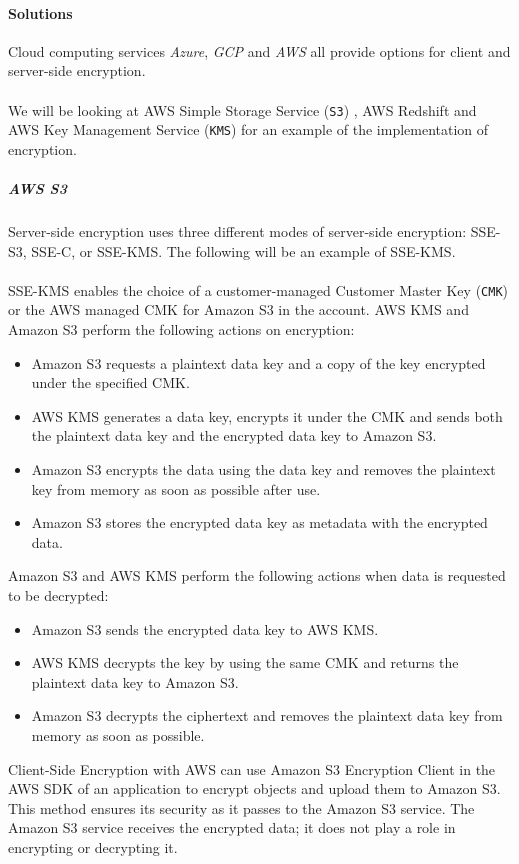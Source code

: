 \documentclass[10pt]{article}
\begin{document}
\paragraph{Solutions} 
Cloud computing services \textit{Azure}, \textit{GCP} and \textit{AWS} all provide options for client and server-side encryption.
\\ \\
We will be looking at AWS Simple Storage Service (\texttt{S3}) \cite{encryption-in-s3}, AWS Redshift \cite{encryption-in-redshift} and AWS Key Management Service (\texttt{KMS}) for an example of the implementation of encryption.
\subparagraph{AWS S3}
Server-side encryption uses three different modes of server-side encryption: SSE-S3, SSE-C, or SSE-KMS. The following will be an example of SSE-KMS.
\\ \\ 
SSE-KMS enables the choice of a customer-managed Customer Master Key (\texttt{CMK}) or the AWS managed CMK for Amazon S3 in the account. AWS KMS and Amazon S3 perform the following actions on encryption:
\begin{itemize}
  \item Amazon S3 requests a plaintext data key and a copy of the key encrypted under the specified CMK.
  \item AWS KMS generates a data key, encrypts it under the CMK and sends both the plaintext data key and the encrypted data key to Amazon S3.
  \item Amazon S3 encrypts the data using the data key and removes the plaintext key from memory as soon as possible after use.
  \item Amazon S3 stores the encrypted data key as metadata with the encrypted data.
\end{itemize}

Amazon S3 and AWS KMS perform the following actions when data is requested to be decrypted:
\begin{itemize}
    \item Amazon S3 sends the encrypted data key to AWS KMS.
    \item AWS KMS decrypts the key by using the same CMK and returns the plaintext data key to Amazon S3.
    \item Amazon S3 decrypts the ciphertext and removes the plaintext data key from memory as soon as possible.
\end{itemize}

Client-Side Encryption with AWS can use Amazon S3 Encryption Client in the AWS SDK of an application to encrypt objects and upload them to Amazon S3. This method ensures its security as it passes to the Amazon S3 service. The Amazon S3 service receives the encrypted data; it does not play a role in encrypting or decrypting it.
\end{document}
